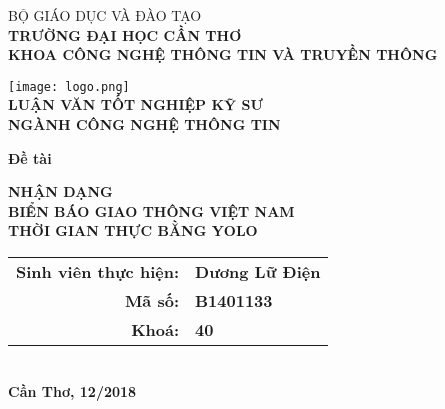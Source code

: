 \documentclass[../thesis.tex]{subfiles}
\begin{document}
\begin{titlepage}

\begin{center}

BỘ GIÁO DỤC VÀ ĐÀO TẠO\\
\textbf{TRƯỜNG ĐẠI HỌC CẦN THƠ\\}
\textbf{KHOA CÔNG NGHỆ THÔNG TIN VÀ TRUYỀN THÔNG\\[1cm]}

\texttt{[image: logo.png]}\\[1cm]

\textbf{LUẬN VĂN TỐT NGHIỆP KỸ SƯ\\}
\textbf{NGÀNH CÔNG NGHỆ THÔNG TIN\\[1.5cm]}

\begin{large}
\textbf{Đề tài\\[0.5cm]}
\end{large}
\textbf{{\LARGE NHẬN DẠNG\\BIỂN BÁO GIAO THÔNG VIỆT NAM\\THỜI GIAN THỰC BẰNG YOLO}}
\\[3.5cm]

\begin{tabular}{ r l }
\textbf{Sinh viên thực hiện:} & \textbf{Dương Lữ Điện}\\ 
\textbf{Mã số:} & \textbf{B1401133}\\  
\textbf{Khoá:} & \textbf{40}   
\end{tabular}
\\[4cm]

\textbf{Cần Thơ, 12/2018}

\end{center}

\end{titlepage}
\end{document}
